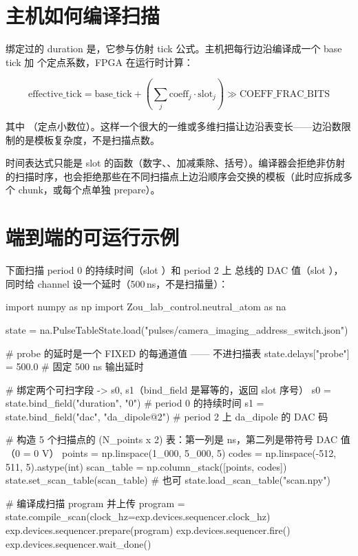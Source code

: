 \documentclass[11pt,oneside,openany]{book}
\begin{document}
\section{主机如何编译扫描}
绑定过的 duration 是，它参与仿射 tick 公式。主机把每行边沿编译成一个 base tick 加  个定点系数，FPGA 在运行时计算：

\begin{equation}
\text{effective\_tick} = \text{base\_tick} + \left(\sum_j \text{coeff}_j \cdot \text{slot}_j\right) \gg \text{COEFF\_FRAC\_BITS}
\label{eq:affine}
\end{equation}

其中 （定点小数位）。这样一个很大的一维或多维扫描让边沿表变长——边沿数限制的是模板复杂度，不是扫描点数。

时间表达式只能是 slot 的函数（数字、、加减乘除、括号）。编译器会拒绝非仿射的扫描时序，也会拒绝那些在不同扫描点上边沿顺序会交换的模板（此时应拆成多个 chunk，或每个点单独 prepare）。

\section{端到端的可运行示例}
下面扫描 period 0 的持续时间（slot ）和 period 2 上  总线的 DAC 值（slot ），同时给  channel 设一个延时（500\,ns，不是扫描量）：

\begin{codeblock}[Python]
import numpy as np
import Zou_lab_control.neutral_atom as na

state = na.PulseTableState.load("pulses/camera_imaging_address_switch.json")

# probe 的延时是一个 FIXED 的每通道值 —— 不进扫描表
state.delays["probe"] = 500.0                 # 固定 500 ns 输出延时

# 绑定两个可扫字段 -> s0, s1（bind_field 是幂等的，返回 slot 序号）
s0 = state.bind_field("duration", "0")        # period 0 的持续时间
s1 = state.bind_field("dac", "da_dipole@2")   # period 2 上 da_dipole 的 DAC 码

# 构造 5 个扫描点的 (N_points x 2) 表：第一列是 ns，第二列是带符号 DAC 值（0 = 0 V）
points = np.linspace(1_000, 5_000, 5)
codes = np.linspace(-512, 511, 5).astype(int)
scan_table = np.column_stack([points, codes])
state.set_scan_table(scan_table)              # 也可 state.load_scan_table("scan.npy")

# 编译成扫描 program 并上传
program = state.compile_scan(clock_hz=exp.devices.sequencer.clock_hz)
exp.devices.sequencer.prepare(program)
exp.devices.sequencer.fire()
exp.devices.sequencer.wait_done()
\end{codeblock}
\end{document}

